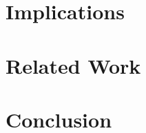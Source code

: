 \documentclass[runningheads,a4paper]{llncs}
\begin{document}
\section{Implications}\label{seq:impl}

\section{Related Work}\label{seq:related}

\section{Conclusion}\label{seq:conclusion}


{}





\end{document}
